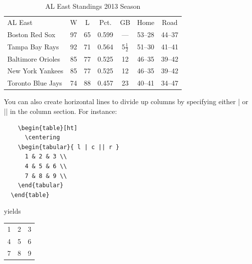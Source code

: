 \documentclass[12pt,a4paper]{article}
\begin{document}
    \begin{table}[ht]
      \centering
        \begin{tabular}{lcccccc}
          AL East & W & L & Pct. & GB & Home & Road \\
          Boston Red Sox & 97 & 65 & 0.599 & — & 53–28 & 44–37\\
          Tampa Bay Rays & 92 & 71 & 0.564 & 5$\frac{1}{2}$ & 51–30 & 41–41\\
          Baltimore Orioles & 85 & 77 & 0.525 & 12 & 46–35 & 39–42\\
          New York Yankees & 85 & 77 & 0.525 & 12 & 46–35 & 39–42\\
          Toronto Blue Jays & 74 & 88 & 0.457 & 23 & 40–41 & 34–47\\
        \end{tabular}
      \caption{AL East Standings 2013 Season\label{tab:aleast2013}}
    \end{table}

    \vspace{.5cm}
    You can also create horizontal lines to divide up columns by specifying
    either | or || in the column section.  For instance:
    \vspace{.5cm}

    \begin{verbatim}
    \begin{table}[ht]
      \centering
    \begin{tabular}{ l | c || r }
      1 & 2 & 3 \\
      4 & 5 & 6 \\
      7 & 8 & 9 \\
    \end{tabular}
  \end{table}
    \end{verbatim}
    \vspace{.5cm}

    yields
    \vspace{.5cm}
    \begin{table}[ht]
      \centering
          \begin{tabular}{ l | c || r }
          1 & 2 & 3 \\
          4 & 5 & 6 \\
          7 & 8 & 9 \\
            \end{tabular}
    \end{table}

  \vspace{.5cm}
\end{document}

